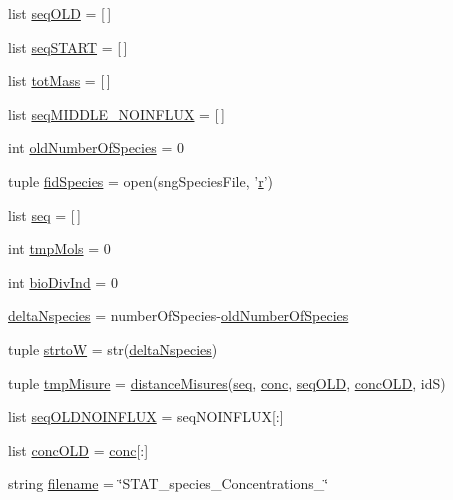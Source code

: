 \begin{DoxyCompactItemize}
\item 
list \hyperlink{a00104_a55e3b17fd716a4b1e28e7b9d93f1943c}{seq\-O\-L\-D} = \mbox{[}$\,$\mbox{]}
\item 
list \hyperlink{a00104_a648282264cfc8a40cf84141f9f59781f}{seq\-S\-T\-A\-R\-T} = \mbox{[}$\,$\mbox{]}
\item 
list \hyperlink{a00104_ac2ecae6789d89cc56b0a731065837774}{tot\-Mass} = \mbox{[}$\,$\mbox{]}
\item 
list \hyperlink{a00104_a8fd1a0445b2e641363a96da5a7e7159b}{seq\-M\-I\-D\-D\-L\-E\-\_\-\-N\-O\-I\-N\-F\-L\-U\-X} = \mbox{[}$\,$\mbox{]}
\item 
int \hyperlink{a00104_abe1ce9bb85ee916d2046efc5c3fe6b30}{old\-Number\-Of\-Species} = 0
\item 
tuple \hyperlink{a00104_afd34aa2ef2c410c2d71007bac0a121fd}{fid\-Species} = open(sng\-Species\-File, '\hyperlink{a00031_ac862e7284527eb913b1351c8bfb8e079}{r}')
\item 
list \hyperlink{a00104_a22eec19fcd0da474a136cfe97438ae3b}{seq} = \mbox{[}$\,$\mbox{]}
\item 
int \hyperlink{a00104_aa24f8efad70335a8460f68902001ce64}{tmp\-Mols} = 0
\item 
int \hyperlink{a00104_a247328d05f06695b0c2de9a001ca4548}{bio\-Div\-Ind} = 0
\item 
\hyperlink{a00104_a555117703c3245ec7d3d73f5d991c8c5}{delta\-Nspecies} = number\-Of\-Species-\/\hyperlink{a00104_abe1ce9bb85ee916d2046efc5c3fe6b30}{old\-Number\-Of\-Species}
\item 
tuple \hyperlink{a00104_abe05028c33fab522e3b940195eaaa586}{strto\-W} = str(\hyperlink{a00104_a555117703c3245ec7d3d73f5d991c8c5}{delta\-Nspecies})
\item 
tuple \hyperlink{a00104_a45529ce20ca353ca8ac251b4e88c91ff}{tmp\-Misure} = \hyperlink{a00104_a76768d52780b1415a920dc94b3c991c0}{distance\-Misures}(\hyperlink{a00104_a22eec19fcd0da474a136cfe97438ae3b}{seq}, \hyperlink{a00027_a941dee33725f074478fdcbf15e1c35ae}{conc}, \hyperlink{a00104_a55e3b17fd716a4b1e28e7b9d93f1943c}{seq\-O\-L\-D}, \hyperlink{a00104_a15f99c617a2dc95e52f741ee99e71b7a}{conc\-O\-L\-D}, id\-S)
\item 
list \hyperlink{a00104_ac796dfff897c2b81d04e71e4f3306d16}{seq\-O\-L\-D\-N\-O\-I\-N\-F\-L\-U\-X} = seq\-N\-O\-I\-N\-F\-L\-U\-X\mbox{[}\-:\mbox{]}
\item 
list \hyperlink{a00104_a15f99c617a2dc95e52f741ee99e71b7a}{conc\-O\-L\-D} = \hyperlink{a00027_a941dee33725f074478fdcbf15e1c35ae}{conc}\mbox{[}\-:\mbox{]}
\item 
string \hyperlink{a00104_a69b59a10e5dc62a6e0d5325e9a27e5c6}{filename} = \char`\"{}S\-T\-A\-T\-\_\-species\-\_\-\-Concentrations\-\_\-\char`\"{}
\end{DoxyCompactItemize}


